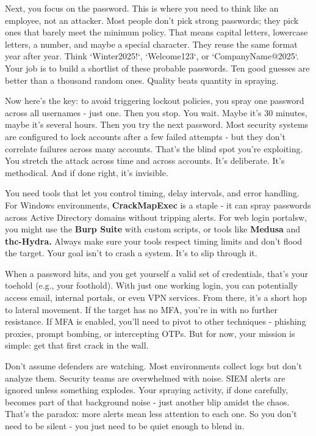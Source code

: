 Next, you focus on the password. This is where you need to think like an employee, not an attacker. Most people don’t pick strong passwords; they pick ones that barely meet the minimum policy. That means capital letters, lowercase letters, a number, and maybe a special character. They reuse the same format year after year. Think `Winter2025!`, `Welcome123`, or `CompanyName@2025`. Your job is to build a shortlist of these probable passwords. Ten good guesses are better than a thousand random ones. Quality beats quantity in spraying.

Now here’s the key: to avoid triggering lockout policies, you spray one password across all usernames - just one. Then you stop. You wait. Maybe it’s 30 minutes, maybe it’s several hours. Then you try the next password. Most security systems are configured to lock accounts after a few failed attempts - but they don’t correlate failures across many accounts. That’s the blind spot you’re exploiting. You stretch the attack across time and across accounts. It’s deliberate. It’s methodical. And if done right, it’s invisible.

You need tools that let you control timing, delay intervals, and error handling. For Windows environments, \textbf{CrackMapExec} is a staple - it can spray passwords across Active Directory domains without tripping alerts. For web login portalsw, you might use the \textbf{Burp Suite} with custom scripts, or tools like \textbf{Medusa} and \textbf{thc-Hydra.} Always make sure your tools respect timing limits and don’t flood the target. Your goal isn’t to crash a system. It’s to slip through it.

When a password hits, and you get yourself a valid set of credentials, that’s your toehold (e.g., your foothold). With just one working login, you can potentially access email, internal portals, or even VPN services. From there, it’s a short hop to lateral movement. If the target has no MFA, you’re in with no further resistance. If MFA is enabled, you’ll need to pivot to other techniques - phishing proxies, prompt bombing, or intercepting OTPs. But for now, your mission is simple: get that first crack in the wall.

Don’t assume defenders are watching. Most environments collect logs but don’t analyze them. Security teams are overwhelmed with noise. SIEM alerts are ignored unless something explodes. Your spraying activity, if done carefully, becomes part of that background noise - just another blip amidst the chaos. That’s the paradox: more alerts mean less attention to each one. So you don’t need to be silent - you just need to be quiet enough to blend in.

